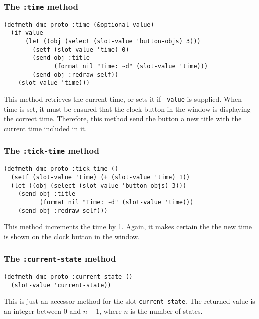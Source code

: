 \subsubsection{The {\tt :time} method}
\begin{verbatim}
(defmeth dmc-proto :time (&optional value)
  (if value
      (let ((obj (select (slot-value 'button-objs) 3)))
        (setf (slot-value 'time) 0)
        (send obj :title 
              (format nil "Time: ~d" (slot-value 'time)))
        (send obj :redraw self))
    (slot-value 'time)))
\end{verbatim}
This method retrieves the current time, or sets it if {\tt
  value} is supplied.  When time is set, it must be ensured that the
clock button in the window is displaying the correct time.  Therefore,
this method send the button a new title with the current time included
in it.

\subsubsection{The {\tt :tick-time} method}
\label{subsubsec:tick-time}
\begin{verbatim}
(defmeth dmc-proto :tick-time ()
  (setf (slot-value 'time) (+ (slot-value 'time) 1))
  (let ((obj (select (slot-value 'button-objs) 3)))
    (send obj :title 
          (format nil "Time: ~d" (slot-value 'time)))
    (send obj :redraw self)))
\end{verbatim}
This method increments the time by 1. Again, it makes certain the the
new time is shown on the clock button in the window.

\subsubsection{The {\tt :current-state} method}
\label{subsubsec:current-state}
\begin{verbatim}
(defmeth dmc-proto :current-state ()
  (slot-value 'current-state))
\end{verbatim}
This is just an accessor method for the slot {\tt current-state}.
The returned value is an integer between $0$ and $n-1$, where $n$ is
the number of states.

